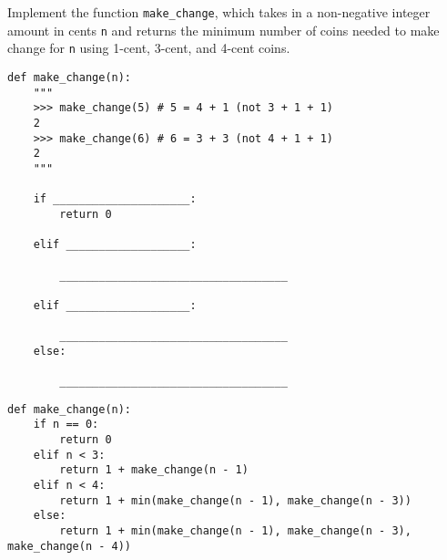 \begin{blocksection}
\question 
Implement the function \lstinline{make_change}, which takes in a non-negative integer amount in cents \lstinline{n} and returns the minimum number of coins needed to make change for \lstinline{n} using 1-cent, 3-cent, and 4-cent coins.

\begin{lstlisting}
def make_change(n):
    """
    >>> make_change(5) # 5 = 4 + 1 (not 3 + 1 + 1)
    2
    >>> make_change(6) # 6 = 3 + 3 (not 4 + 1 + 1)
    2
    """

    if _____________________:
        return 0

    elif ___________________:

        ___________________________________

    elif ___________________:

        ___________________________________
    else:

        ___________________________________
\end{lstlisting}
\end{blocksection}

\begin{blocksection}
\begin{solution}
\begin{lstlisting}
def make_change(n):
    if n == 0:
        return 0
    elif n < 3:
        return 1 + make_change(n - 1)
    elif n < 4:
        return 1 + min(make_change(n - 1), make_change(n - 3))
    else:
        return 1 + min(make_change(n - 1), make_change(n - 3), make_change(n - 4))
\end{lstlisting}
\end{solution}
\end{blocksection}

